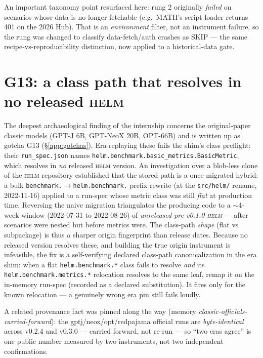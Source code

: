 \documentclass[11pt]{report}
\newcommand{\code}[1]{\texttt{#1}}
\newcommand{\file}[1]{\texttt{#1}}
\begin{document}
An important taxonomy point resurfaced here: rung 2 originally \emph{failed} on
scenarios whose data is no longer fetchable (e.g.\ MATH's script loader returns 401
on the 2026 Hub). That is an \emph{environment} filter, not an instrument failure,
so the rung was changed to classify data-fetch/auth crashes as SKIP --- the same
recipe-vs-reproducibility distinction, now applied to a historical-data gate.

\section{G13: a class path that resolves in no released \textsc{helm}}
\label{sec:g13}

The deepest archaeological finding of the internship concerns the original-paper
classic models (GPT-J 6B, GPT-NeoX 20B, OPT-66B) and is written up as gotcha G13
(\S\ref{app:gotchas}). Era-replaying these fails the shim's class preflight: their
\file{run\_spec.json} names \code{helm.benchmark.basic\_metrics.BasicMetric}, which
resolves in \emph{no} released \textsc{helm} version. An investigation over a
blob-less clone of the \textsc{helm} repository established that the stored path is
a once-migrated hybrid: a bulk \code{benchmark.}$\rightarrow$\code{helm.benchmark.}
prefix rewrite (at the \code{src/helm/} rename, 2022-11-16) applied to a run-spec
whose metric class was still \emph{flat} at production time. Reversing the naive
migration triangulates the producing code to a $\sim$4-week window
(2022-07-31 to 2022-08-26) of \emph{unreleased pre-v0.1.0 \textsc{helm}} --- after
scenarios were nested but before metrics were. The class-path \emph{shape} (flat
vs subpackage) is thus a sharper origin fingerprint than release dates. Because no
released version resolves these, and building the true origin instrument is
infeasible, the fix is a self-verifying declared class-path canonicalization in the
era shim: when a flat \code{helm.benchmark.*} class fails to resolve \emph{and} its
\code{helm.benchmark.metrics.*} relocation resolves to the same leaf, remap it on
the in-memory run-spec (recorded as a declared substitution). It fires only for the
known relocation --- a genuinely wrong era pin still fails loudly.

A related provenance fact was pinned along the way (memory
\emph{classic-officials-carried-forward}): the gptj/neox/opt/redpajama official
runs are \emph{byte-identical} across v0.2.4 and v0.3.0 --- carried forward, not
re-run --- so ``two eras agree'' is one public number measured by two instruments,
not two independent confirmations.
\end{document}
